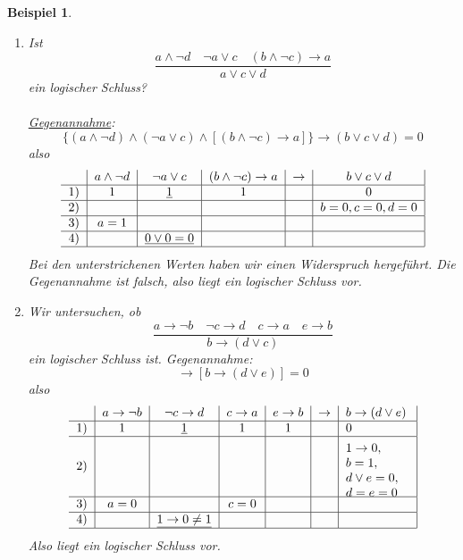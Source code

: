 \documentclass{report}
\newtheorem{myexample}{Beispiel}
\begin{document}
\begin{myexample}
\begin{enumerate}
\item Ist
\begin{equation}\frac{a \land \lnot d \quad \lnot a \lor c \quad (b \land \lnot c) \to a}{a \lor c \lor d}\end{equation}ein logischer Schluss?\\\\
\underline{Gegenannahme}:
\begin{equation}\{(a \land \lnot d) \land (\lnot a \lor c) \land [(b \land \lnot c) \to a]\} \to (b \lor c \lor d) = 0\end{equation}also
\begin{equation}\begin{tabular}{c | c | c | c | c | c |}
& $a \land \lnot d$ & $\lnot a \lor c$ & $(b \land \lnot c) \to a$ & $\to$ & $b \lor c \lor d$ \\ \hline
1) & 1 & \underline{1} & 1 & & 0 \\ \hline
2) & & & & & $b=0, c=0, d=0$ \\ \hline
3) & $a=1$ & & & & \\ \hline
4) & & \underline{$0 \lor 0 = 0$} & & & \\ \hline
\end{tabular}\end{equation}Bei den unterstrichenen Werten haben wir einen Widerspruch hergeführt. Die Gegenannahme ist falsch, also liegt ein logischer Schluss vor.
\item Wir untersuchen, ob
\begin{equation}\frac{a \to \lnot b \quad \lnot c \to d \quad c \to a \quad e \to b}{b \to (d \lor c)}\end{equation}ein logischer Schluss ist. Gegenannahme:
\begin{equation}[(a \to \lnot b) \land (\lnot c \to d) \land (c \to a) \land (e \to b)] \to [b \to (d \lor e)] = 0\end{equation}
also
\begin{equation}\begin{tabular}{c | c | c | c | c | c | p{1.8cm}|}
& $a \to \lnot b$ & $\lnot c \to d$ & $c \to a$ & $e \to b$ & $\to$ & $b \to (d \lor e)$ \\ \hline
1) & 1 & \underline{1} & 1 & 1 & & 0 \\ \hline
2) & & & & & & \parbox{1.8cm}{$\\1 \to 0,\\b=1,\\d \lor e=0,\\ d=e=0$} \\ \hline
3) & $a=0$ & & $c=0$ & & & \\ \hline
4) & & \underline{$1 \to 0 \neq 1$} & & & & \\ \hline
\end{tabular}\end{equation}Also liegt ein logischer Schluss vor.\end{enumerate}
\end{myexample}
\end{document}
